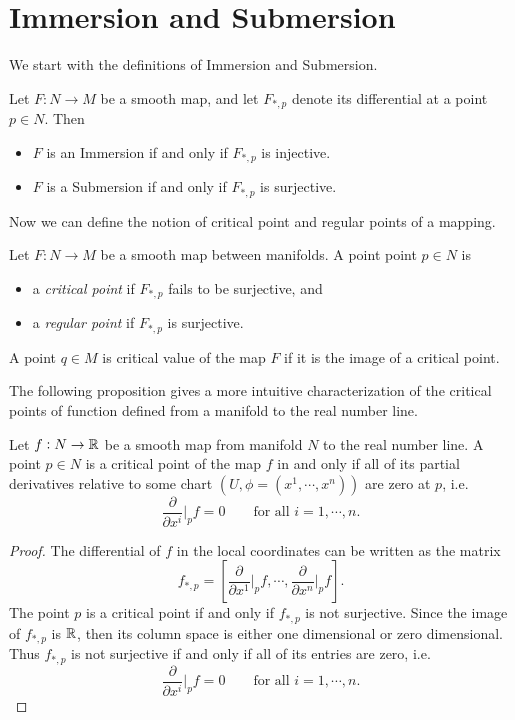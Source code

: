 \section{Immersion and Submersion}
We start with the definitions of Immersion and Submersion.
\begin{definition}
	Let $ F:N\to M $ be a smooth map, and let $ F_{*,p} $ denote its differential at a point $ p \in N $. Then 
	\begin{itemize}[noitemsep]
		\item $ F $ is an Immersion if and only if $ F_{*,p} $ is injective.
		\item $ F $ is a Submersion if and only if $ F_{*,p} $ is surjective.
	\end{itemize}
\end{definition}

Now we can define the notion of critical point and regular points of a mapping.
\begin{definition}
	Let $ F:N \to M $ be a smooth map between manifolds. A point point $ p  \in N$ is
	\begin{itemize}[noitemsep]
		\item a \emph{critical point} if $ F_{*,p} $ fails to be surjective, and
		\item a \emph{regular point} if $ F_{*,p} $ is surjective.
	\end{itemize}
	A point $ q \in M $ is critical value of the map $ F $ if it is the image of a critical point.
\end{definition}

The following proposition gives a more intuitive characterization of the critical points of function defined from a manifold to the real number line.

\begin{proposition}
	Let $ f: N \to \mathbb{R} $ be a smooth map from manifold $ N $ to the real number line. A point $ p \in N $ is a critical point of the map $ f $ in and only if all of its partial derivatives relative to some chart $ (U,\phi=(x^1,\cdots,x^n)) $ are zero at $ p $, i.e.
	\[ \frac{\partial }{\partial x^i}\big|_{p} f = 0 \qquad \text{for all } i = 1,\cdots, n. \]
\end{proposition}
\begin{proof}
	The differential of $ f $ in the local coordinates can be written as the matrix
	\[ f_{*,p} = [ \frac{\partial}{\partial  x^1}\big|_{p} f, \cdots, \frac{\partial}{\partial  x^n}\big|_{p} f ]. \]
	The point $ p $ is a critical point if and only if $ f_{*,p} $ is not surjective. Since the image of $ f_{*,p} $ is $ \mathbb{R} $, then its column space is either one dimensional or zero dimensional. Thus $ f_{*,p} $ is not surjective if and only if all of its entries are zero, i.e.
	\[ \frac{\partial }{\partial x^i}\big|_{p} f = 0 \qquad \text{for all } i = 1,\cdots, n. \]
\end{proof}


